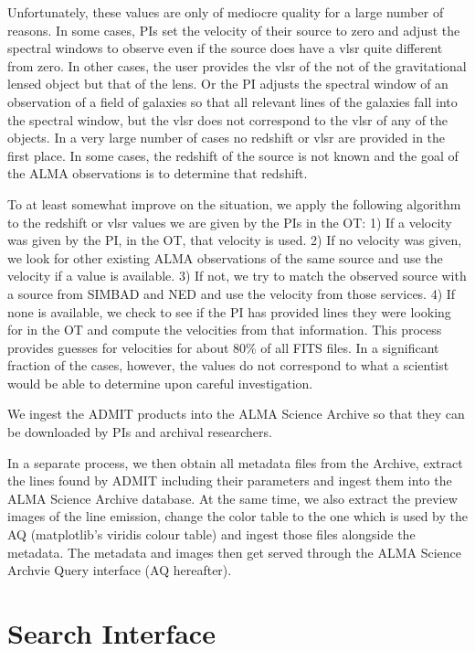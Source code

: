 \documentclass[11pt,twoside]{article}
\begin{document}
Unfortunately, these values are only of mediocre quality for a large number of reasons. In some cases, PIs set the velocity of their source to zero and adjust the spectral windows to observe even if the source does have a vlsr quite different from zero. In other cases, the user provides the vlsr of the not of the gravitational lensed object but that of the lens. Or the PI adjusts the spectral window of an observation of a field of galaxies so that all relevant lines of the galaxies fall into the spectral window, but the vlsr does not correspond to the vlsr of any of the objects. In a very large number of cases no redshift or vlsr are provided in the first place. In some cases, the redshift of the source is not known and the goal of the ALMA observations is to determine that redshift.

To at least somewhat improve on the situation, we apply the following algorithm to the redshift or vlsr values we are given by the PIs in the OT: 1) If a velocity was given by the PI, in the OT, that velocity is used. 2) If no velocity was given, we look for other existing ALMA observations of the same source and use the velocity if a value is available. 3) If not, we try to match the observed source with a source from SIMBAD and NED and use the velocity from those services. 4) If none is available, we check to see if the PI has provided lines they were looking for in the OT and compute the velocities from that information. This process provides guesses for velocities for about 80\% of all FITS files. In a significant fraction of the cases, however, the values do not correspond to what a scientist would be able to determine upon careful investigation.

We ingest the ADMIT products into the ALMA Science Archive so that they can be downloaded by PIs and archival researchers.

In a separate process, we then obtain all metadata files from the Archive, extract the lines found by ADMIT including their parameters and ingest them into the ALMA Science Archive database. At the same time, we also extract the preview images of the line emission, change the color table to the one which is used by the AQ (matplotlib's viridis colour table) and ingest those files alongside the metadata. The metadata and images then get served through the ALMA Science Archvie Query interface (AQ hereafter).

\section{Search Interface}
\end{document}

